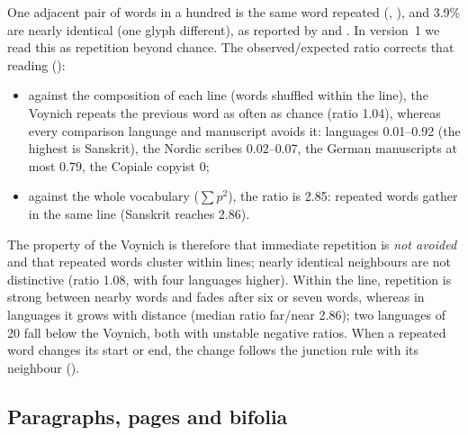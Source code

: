 One adjacent pair of words in a hundred is the same word repeated (, ), and 3.9\% are
nearly identical (one glyph different), as reported by \citet{boxer2022} and \citet{bowernlindemann2021}. In version~1 we
read this as repetition beyond chance. The observed/expected ratio corrects that reading ():
\begin{itemize}
\item against the composition of each line (words shuffled within the line), the Voynich repeats the previous word as
  often as chance (ratio 1.04), whereas every comparison language and manuscript avoids it: languages 0.01--0.92 (the
highest is Sanskrit),
  the Nordic scribes 0.02--0.07, the German manuscripts at most 0.79, the Copiale copyist 0;
\item against the whole vocabulary ($\sum p^2$), the ratio is 2.85: repeated words gather in the same line (Sanskrit
  reaches 2.86).
\end{itemize}
The property of the Voynich is therefore that immediate repetition is \emph{not avoided} and that repeated words cluster
within lines; nearly identical neighbours are not distinctive (ratio 1.08, with four languages higher). Within the line,
repetition is strong between nearby words and fades after six or seven words, whereas in languages it grows with distance
(median ratio far/near 2.86); two languages of 20 fall below the Voynich, both with unstable negative ratios. When a
repeated word changes its start or end, the change follows the junction rule with its neighbour ().

\subsection{Paragraphs, pages and bifolia}
\label{sec:book}

